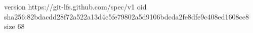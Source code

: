 version https://git-lfs.github.com/spec/v1
oid sha256:82bdacdd28f72a522a13d4c5fe79802a5d9106bdcda2fe8dfe9c408ed1608ce8
size 68
